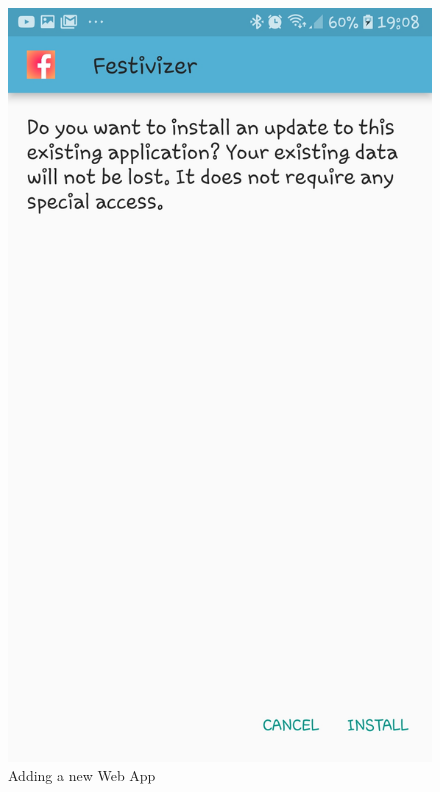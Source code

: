 				\begin{figure}[H]
					\includegraphics[width=\linewidth]{images/Android_2.jpg}
					\caption{Adding a new Web App}
					\label{fig:android_2}
				\end{figure}
			
